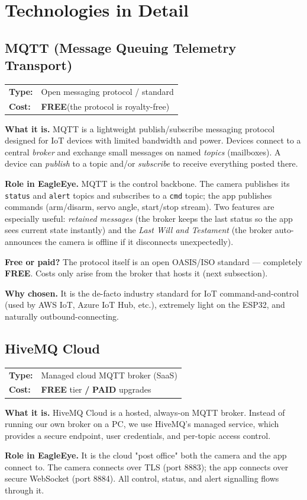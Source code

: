 \documentclass[11pt,a4paper]{article}
\makeatletter
\newcommand{\code}[1]{\texttt{#1}}
\newcommand{\free}{\textbf{\color{freegreen}FREE}}
\newcommand{\freepaid}{\textbf{\color{freegreen}FREE} tier \textbf{/} \textbf{\color{paidorange}PAID} upgrades}
\newcommand{\techhead}[2]{\par\vspace{0.3em}\noindent
  \begin{tabularx}{\linewidth}{@{}lX@{}}
  \textbf{Type:} & #1 \\
  \textbf{Cost:} & #2 \\
  \end{tabularx}\par\vspace{0.3em}}
\makeatother
\begin{document}
\section{Technologies in Detail}\label{sec:tech}

\subsection{MQTT (Message Queuing Telemetry Transport)}
\techhead{Open messaging protocol / standard}{\free (the protocol is royalty-free)}
\textbf{What it is.} MQTT is a lightweight publish/subscribe messaging protocol designed for
IoT devices with limited bandwidth and power. Devices connect to a central \emph{broker} and
exchange small messages on named \emph{topics} (mailboxes). A device can \emph{publish} to a
topic and/or \emph{subscribe} to receive everything posted there.

\textbf{Role in EagleEye.} MQTT is the control backbone. The camera publishes its
\code{status} and \code{alert} topics and subscribes to a \code{cmd} topic; the app publishes
commands (arm/disarm, servo angle, start/stop stream). Two features are especially useful:
\emph{retained messages} (the broker keeps the last status so the app sees current state
instantly) and the \emph{Last Will and Testament} (the broker auto-announces the camera is
offline if it disconnects unexpectedly).

\textbf{Free or paid?} The protocol itself is an open OASIS/ISO standard --- completely
\free. Costs only arise from the broker that hosts it (next subsection).

\textbf{Why chosen.} It is the de-facto industry standard for IoT command-and-control (used by
AWS IoT, Azure IoT Hub, etc.), extremely light on the ESP32, and naturally outbound-connecting.

\subsection{HiveMQ Cloud}
\techhead{Managed cloud MQTT broker (SaaS)}{\freepaid}
\textbf{What it is.} HiveMQ Cloud is a hosted, always-on MQTT broker. Instead of running our
own broker on a PC, we use HiveMQ's managed service, which provides a secure endpoint, user
credentials, and per-topic access control.

\textbf{Role in EagleEye.} It is the cloud "post office" both the camera and the app connect
to. The camera connects over TLS (port 8883); the app connects over secure WebSocket (port
8884). All control, status, and alert signalling flows through it.
\end{document}
